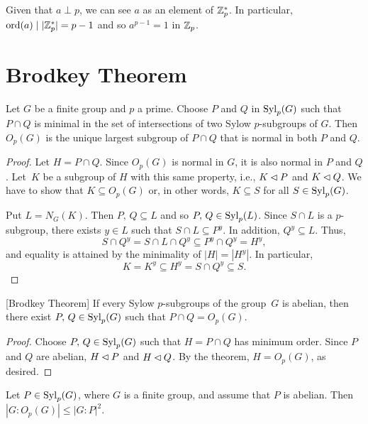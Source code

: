 \begin{solution} Given that $a\perp p$, we can see $a$ as an element of $\mathbb{Z}_p^*$. In particular, ${\rm ord}(a)\mid|\mathbb{Z}_p^*|=p-1$ and so $a^{p-1}=1$ in $\mathbb{Z}_p$.  \end{solution}

\section{Brodkey Theorem}

\begin{thm}\label{brodkey-general}
    Let\/ $G$ be a finite group and\/ $p$ a prime. Choose\/ $P$ and\/ $Q$ in ${\rm Syl}_p(G)$ such that\/ $P\cap Q$ is minimal in the set of intersections of two Sylow\/ $p$-subgroups of\/ $G$. Then\/ $O_p(G)$ is the unique largest subgroup of\/ $P\cap Q$ that is normal in both $P$ and $Q$.
\end{thm}

\begin{proof} Let $H=P\cap Q$. Since $O_p(G)$ is normal in $G$, it is also normal in $P$ and $Q$. Let~$K$ be a subgroup of $H$ with this same property, i.e., $K\lhd P$ and $K\lhd Q$. We have to show that $K\subseteq O_p(G)$ or, in other words, $K\subseteq S$ for all $S\in{\rm Syl}_p(G)$.

Put $L=N_G(K)$. Then $P,\, Q\subseteq L$ and so $P,\,Q\in{\rm Syl}_p(L)$. Since $S\cap L$ is a $p$-subgroup, there exists $y\in L$ such that $S\cap L\subseteq P^y$. In addition, $Q^y\subseteq L$. Thus,
$$
    S\cap Q^y = S\cap L\cap Q^y \subseteq P^y\cap Q^y = H^y,
$$
and equality is attained by the minimality of $|H|=|H^y|$. In particular,
$$
    K=K^y\subseteq H^y = S\cap Q^y \subseteq S.
$$
 \end{proof}

\begin{cor}\label{brodkey-thm}{\rm[Brodkey Theorem]}
    If every Sylow $p$-subgroups of the group\/~$G$ is abelian, then there exist $P,\,Q\in{\rm Syl}_p(G)$ such that $P\cap Q = O_p(G)$.
\end{cor}

\begin{proof} Choose $P,\,Q\in{\rm Syl}_p(G)$ such that $H=P\cap Q$ has minimum order. Since $P$ and $Q$ are abelian, $H\lhd P$ and $H\lhd Q$. By the theorem, $H=O_p(G)$, as desired.  \end{proof}

\begin{cor}
    Let\/ $P\in{\rm Syl}_p(G)$, where\/ $G$ is a finite group, and assume that\/ $P$ is abelian. Then $|G:O_p(G)|\le|G:P|^2$.
\end{cor}

